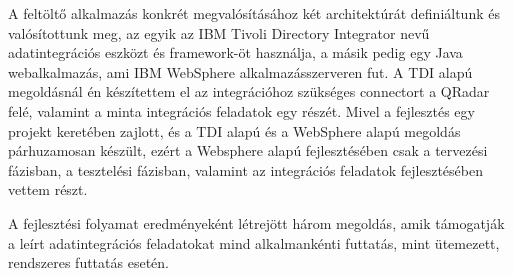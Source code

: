 A feltöltő alkalmazás konkrét megvalósításához két architektúrát definiáltunk és valósítottunk meg, az egyik az IBM Tivoli Directory Integrator nevű adatintegrációs eszközt és framework-öt használja, a másik pedig egy Java webalkalmazás, ami IBM WebSphere alkalmazásszerveren fut. A TDI alapú megoldásnál én készítettem el az integrációhoz szükséges connectort a QRadar felé, valamint a minta integrációs feladatok egy részét.  Mivel a fejlesztés egy projekt keretében zajlott, és a TDI alapú és a WebSphere alapú megoldás párhuzamosan készült, ezért a Websphere alapú fejlesztésében csak a tervezési fázisban, a tesztelési fázisban, valamint az integrációs feladatok fejlesztésében vettem részt.

A fejlesztési folyamat eredményeként létrejött három megoldás, amik támogatják a leírt adatintegrációs feladatokat mind alkalmankénti futtatás, mint ütemezett, rendszeres futtatás esetén.

